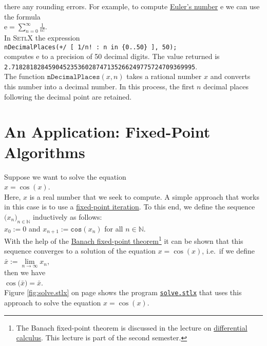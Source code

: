 there any rounding errors.  For example, to compute
\href{https://en.wikipedia.org/wiki/E_(mathematical_constant)}{Euler's number} $\mathrm{e}$ we can use the formula
\\[0.2cm]
\hspace*{1.3cm}
$\displaystyle \mathrm{e} = \sum\limits_{n=0}^\infty \frac{1}{n!}$.
\\[0.2cm]
In \textsc{SetlX} the expression
\\[0.2cm]
\hspace*{1.3cm}
\texttt{nDecimalPlaces(+/ [ 1/n! : n in \{0..50\} ], 50);}
\\[0.2cm]
computes $\mathrm{e}$ to a precision of 50 decimal digits.  The value returned is
\\[0.2cm]
\hspace*{1.3cm}
\texttt{2.71828182845904523536028747135266249775724709369995}.
\\[0.2cm]
The function $\texttt{nDecimalPlaces}(x, n)$ takes a rational number $x$ and converts this number into a
decimal number.  In this process, the first $n$ decimal places following the decimal point are retained.


\section{An Application: Fixed-Point Algorithms}
Suppose we want to solve the equation \\[0.2cm]
\hspace*{1.3cm} $x = \cos(x)$. \\[0.2cm]
Here, $x$ is a real number that we seek to compute.  A simple approach that works in this case is to use a
\href{https://en.wikipedia.org/wiki/Fixed-point_iteration}{fixed-point iteration}.  To this end, we
define the sequence $\bigl(x_n\bigr)_{n\in\mathbb{N}}$ inductively as follows:
\\[0.2cm]
\hspace*{1.3cm} 
$x_0 := 0$ \quad and \quad $x_{n+1} := \mathtt{cos}(x_n)$ \quad for all $n \in \mathbb{N}$. 
\\[0.2cm]
With the help of the 
\href{https://en.wikipedia.org/wiki/Banach_fixed-point_theorem}{Banach fixed-point theorem}\footnote{
  The Banach fixed-point theorem is discussed in the lecture on
  \href{https://en.wikipedia.org/wiki/Differential_calculus}{differential calculus}.  This lecture is part of the
  second semester.
}
it can be shown that this sequence converges to a solution of the equation $x = \cos(x)$, i.e.~if we define
\\[0.2cm]
\hspace*{1.3cm}
$\bar{x} := \lim\limits_{n\rightarrow\infty} x_n$,
\\[0.2cm]
then we have
\\[0.2cm]
\hspace*{1.3cm}
$\cos\bigl(\bar{x}\bigr) = \bar{x}$.
\\[0.2cm]
Figure \ref{fig:solve.stlx} on page \pageref{fig:solve.stlx} shows the program
\href{https://github.com/karlstroetmann/Logik/blob/master/SetlX/solve.stlx}{\texttt{solve.stlx}}
that uses this approach to solve the equation $x = \cos(x)$.


